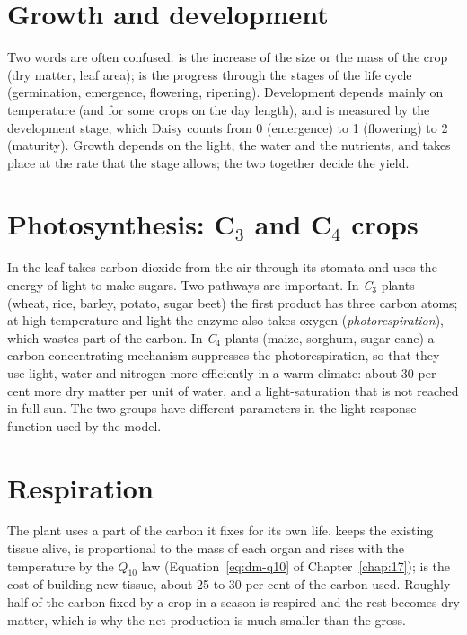 \section{Growth and development}
Two words are often confused.  is the increase of the size or the mass of the crop (dry matter, leaf area);  is the progress through the stages of the life cycle (germination, emergence, flowering, ripening). Development depends mainly on temperature (and for some crops on the day length), and is measured by the development stage, which Daisy counts from 0 (emergence) to 1 (flowering) to 2 (maturity). Growth depends on the light, the water and the nutrients, and takes place at the rate that the stage allows; the two together decide the yield.

\section{Photosynthesis: C$_3$ and C$_4$ crops}
In  the leaf takes carbon dioxide from the air through its stomata and uses the energy of light to make sugars. Two pathways are important. In \emph{C$_3$} plants (wheat, rice, barley, potato, sugar beet) the first product has three carbon atoms; at high temperature and light the enzyme also takes oxygen (\emph{photorespiration}), which wastes part of the carbon. In \emph{C$_4$} plants (maize, sorghum, sugar cane) a carbon-concentrating mechanism suppresses the photorespiration, so that they use light, water and nitrogen more efficiently in a warm climate: about 30 per cent more dry matter per unit of water, and a light-saturation that is not reached in full sun. The two groups have different parameters in the light-response function used by the model.

\section{Respiration}
The plant uses a part of the carbon it fixes for its own life.  keeps the existing tissue alive, is proportional to the mass of each organ and rises with the temperature by the $Q_{10}$ law (Equation~\ref{eq:dm-q10} of Chapter~\ref{chap:17});  is the cost of building new tissue, about 25 to 30 per cent of the carbon used. Roughly half of the carbon fixed by a crop in a season is respired and the rest becomes dry matter, which is why the net production is much smaller than the gross.

